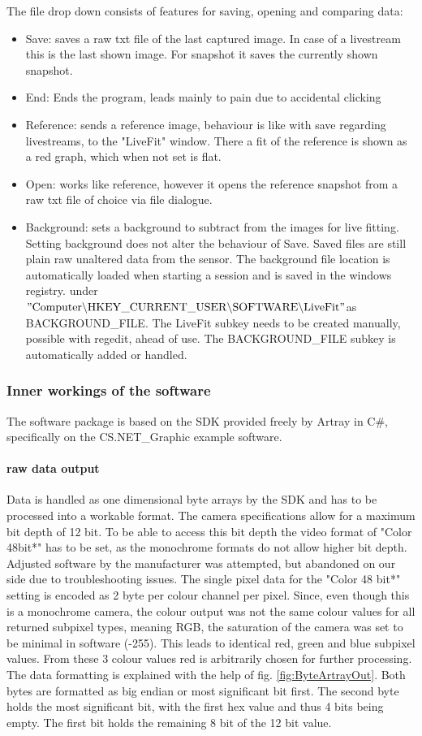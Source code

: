 \documentclass[twoside,openright]{scrreprt}
\begin{document}
The file drop down consists of features for saving, opening and comparing data:
\begin{itemize}
\item Save: saves a raw txt file of the last captured image. In case of a livestream this is the last shown image. For snapshot it saves the currently shown snapshot.
\item End: Ends the program, leads mainly to pain due to accidental clicking
\item Reference: sends a reference image, behaviour is like with save regarding livestreams, to the "LiveFit" window. There a fit of the reference is shown as a red graph, which when not set is flat.
\item Open: works like reference, however it opens the reference snapshot from a raw txt file of choice via file dialogue.
\item Background: sets a background to subtract from the images for live fitting. Setting background does not alter the behaviour of Save. Saved files are still plain raw unaltered data from the sensor. The background file location is automatically loaded when starting a session and is saved in the windows registry. under $\mathrm{"Computer \backslash HKEY\_CURRENT\_USER \backslash SOFTWARE \backslash LiveFit"}$as BACKGROUND\_FILE. The LiveFit subkey needs to be created manually, possible with regedit, ahead of use. The BACKGROUND\_FILE subkey is automatically added or handled.
\end{itemize}
\subsubsection{Inner workings of the software}
The software package is based on the SDK provided freely by Artray in C\#, specifically on the CS.NET\_Graphic example software. 

\paragraph{raw data output}
Data is handled as one dimensional byte arrays by the SDK and has to be processed into a workable format. The camera specifications allow for a maximum bit depth of 12 bit. To be able to access this bit depth the video format of "Color 48bit*" has to be set, as the monochrome formats do not allow higher bit depth. Adjusted software by the manufacturer was attempted, but abandoned on our side due to troubleshooting issues. The single pixel data for the "Color 48 bit*" setting is encoded as 2 byte per colour channel per pixel. Since, even though this is a monochrome camera, the colour output was not the same colour values for all returned subpixel types, meaning RGB, the saturation of the camera was set to be minimal in software (-255). This leads to identical red, green and blue subpixel values. From these 3 colour values red is arbitrarily chosen for further processing.
The data formatting is explained with the help of fig. \ref{fig:ByteArtrayOut}. Both bytes are formatted as big endian or most significant bit first. The second byte holds the most significant bit, with the first hex value and thus 4 bits being empty. The first bit holds the remaining 8 bit of the 12 bit value.
\end{document}
